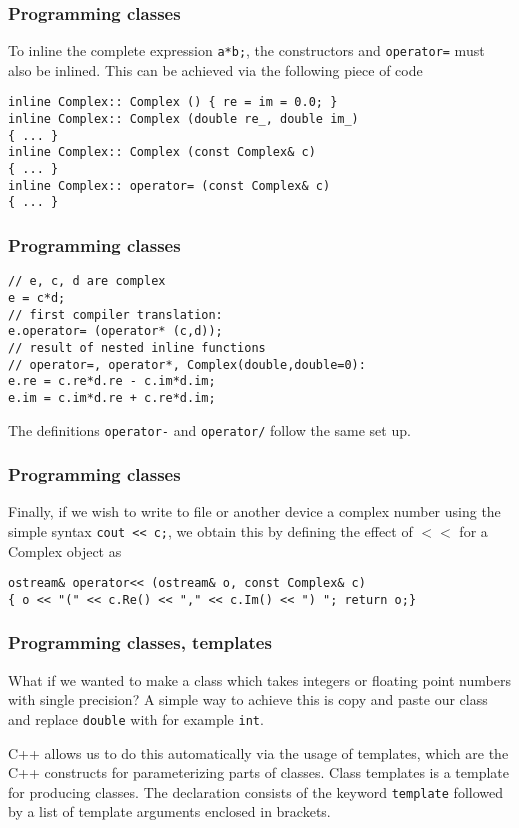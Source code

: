 \documentclass{beamer}
\begin{document}
\begin{frame}
\frametitle{Programming classes}

To inline the complete expression \Verb!a*b;!, the constructors and
\Verb!operator=!  must also be inlined.  This can be achieved via the following piece of code

\begin{verbatim}
inline Complex:: Complex () { re = im = 0.0; }
inline Complex:: Complex (double re_, double im_)
{ ... }
inline Complex:: Complex (const Complex& c)
{ ... }
inline Complex:: operator= (const Complex& c)
{ ... }
\end{verbatim}
\end{frame}

\begin{frame}
\frametitle{Programming classes}

\begin{verbatim}
// e, c, d are complex
e = c*d;
// first compiler translation:
e.operator= (operator* (c,d));
// result of nested inline functions
// operator=, operator*, Complex(double,double=0):
e.re = c.re*d.re - c.im*d.im;
e.im = c.im*d.re + c.re*d.im;
\end{verbatim}
The definitions \Verb!operator-! and \Verb!operator/! follow the same set up.
\end{frame}

\begin{frame}
\frametitle{Programming classes}

Finally, if we wish to write to file or another device a complex number using the simple syntax
\Verb!cout << c;!, we obtain this by defining
the effect of $<<$ for a Complex object as

\begin{verbatim}
ostream& operator<< (ostream& o, const Complex& c)
{ o << "(" << c.Re() << "," << c.Im() << ") "; return o;}
\end{verbatim}
\end{frame}

\begin{frame}
\frametitle{Programming classes, templates}

What if we wanted to make a class which takes integers
or floating point numbers with single precision?
A simple way to achieve this is copy and paste our class and replace \Verb!double! with for
example \Verb!int!.

C++  allows us to do this automatically via the usage of templates, which
are the C++ constructs for parameterizing parts of
classes. Class templates  is a template for producing classes. The declaration consists
of the keyword \Verb!template! followed by a list of template arguments enclosed in brackets.
\end{frame}
\end{document}
